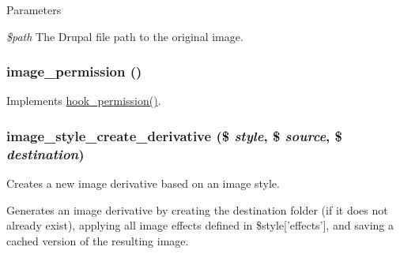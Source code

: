 \begin{DoxyParams}{Parameters}
\item[{\em \$path}]The Drupal file path to the original image. \end{DoxyParams}
\hypertarget{image_8module_afa11fbedc7ee323dcaa0a52b4ffab623}{
\subsubsection[{image\_\-permission}]{\setlength{\rightskip}{0pt plus 5cm}image\_\-permission ()}}
\label{image_8module_afa11fbedc7ee323dcaa0a52b4ffab623}
Implements \hyperlink{group__hooks_ga2b22b45f4925f2478412477bae329713}{hook\_\-permission()}. \hypertarget{image_8module_ac097959664fd40ab625104fb98090ee3}{
\subsubsection[{image\_\-style\_\-create\_\-derivative}]{\setlength{\rightskip}{0pt plus 5cm}image\_\-style\_\-create\_\-derivative (\$ {\em style}, \/  \$ {\em source}, \/  \$ {\em destination})}}
\label{image_8module_ac097959664fd40ab625104fb98090ee3}
Creates a new image derivative based on an image style.

Generates an image derivative by creating the destination folder (if it does not already exist), applying all image effects defined in \$style\mbox{[}'effects'\mbox{]}, and saving a cached version of the resulting image.



